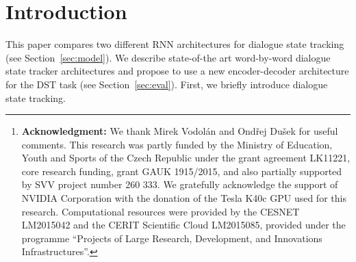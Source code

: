 \documentclass{itatnew}
\begin{document}
\begin{abstract}
This paper discusses models for dialogue state tracking using recurrent neural networks (RNN).
We present experiments on the standard dialogue state tracking (DST) dataset, DSTC2~\cite{henderson2014second}.
On the one hand, RNN models became the state of the art models in DST,
on the other hand, most state-of-the-art models are only turn-based and require dataset-specific preprocessing (e.g. DSTC2-specific) in order to achieve such results.
We implemented two architectures which can be used in incremental settings and require almost no preprocessing.
We compare their performance to the benchmarks on DSTC2 and discuss their properties.
With only trivial preprocessing, the performance of our models is close to the state-of-the-art results.\footnote{
    {\bf Acknowledgment:} We thank Mirek Vodolán and Ondřej Dušek for useful comments.
    This research was partly funded by the Ministry of Education, Youth and Sports of the Czech Republic under the grant agreement LK11221, core research funding, grant GAUK 1915/2015, and also partially supported by SVV project number 260 333. 
    We gratefully acknowledge the support of NVIDIA Corporation with the donation of the Tesla K40c GPU used for this research.
    Computational resources were provided by the CESNET LM2015042 and the CERIT Scientific Cloud LM2015085, provided under the programme ``Projects of Large Research, Development, and Innovations Infrastructures''.
    }
\end{abstract}

\section{Introduction}
 
This paper compares two different RNN architectures for dialogue state tracking (see Section~\ref{sec:model}).
We describe state-of-the art word-by-word dialogue state tracker architectures and propose to use a new encoder-decoder architecture for the DST task (see Section~\ref{sec:eval}).
First, we briefly introduce dialogue state tracking.
\end{document}
